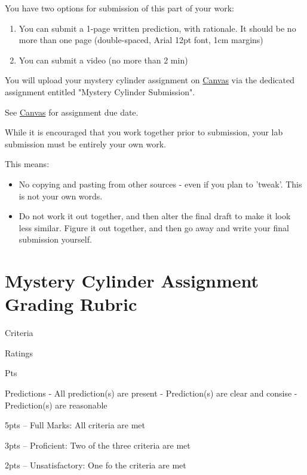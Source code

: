 \documentclass[
]{book}
\providecommand{\tightlist}{%
  \setlength{\itemsep}{0pt}\setlength{\parskip}{0pt}}
\begin{document}
You have two options for submission of this part of your work:

\begin{enumerate}
\def\labelenumi{\arabic{enumi}.}
\tightlist
\item
  You can submit a 1-page written prediction, with rationale. It should be no more than one page (double-spaced, Arial 12pt font, 1cm margins)
\item
  You can submit a video (no more than 2 min)
\end{enumerate}

You will upload your mystery cylinder assignment on \href{https://canvas.ubc.ca}{Canvas} via the dedicated assignment entitled "Mystery Cylinder Submission".

See \href{https://canvas.ubc.ca}{Canvas} for assignment due date.

While it is encouraged that you work together prior to submission, your lab submission must be entirely your own work.

This means:

\begin{itemize}
\tightlist
\item
  No copying and pasting from other sources - even if you plan to 'tweak'. This is not your own words.
\item
  Do not work it out together, and then alter the final draft to make it look less similar. Figure it out together, and then go away and write your final submission yourself.
\end{itemize}

\hypertarget{mystery-cylinder-assignment-grading-rubric}{%
\section*{Mystery Cylinder Assignment Grading Rubric}\label{mystery-cylinder-assignment-grading-rubric}}

Criteria

Ratings

Pts

Predictions
- All prediction(s) are present
- Prediction(s) are clear and consise
- Prediction(s) are reasonable

5pts -- Full Marks: All criteria are met

3pts -- Proficient: Two of the three criteria are met

2pts -- Unsatisfactory: One fo the criteria are met
\end{document}
